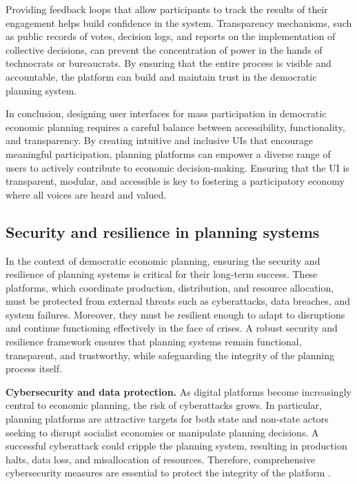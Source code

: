 \begin{refsection}
Providing feedback loops that allow participants to track the results of their engagement helps build confidence in the system. Transparency mechanisms, such as public records of votes, decision logs, and reports on the implementation of collective decisions, can prevent the concentration of power in the hands of technocrats or bureaucrats. By ensuring that the entire process is visible and accountable, the platform can build and maintain trust in the democratic planning system.

\medskip

In conclusion, designing user interfaces for mass participation in democratic economic planning requires a careful balance between accessibility, functionality, and transparency. By creating intuitive and inclusive UIs that encourage meaningful participation, planning platforms can empower a diverse range of users to actively contribute to economic decision-making. Ensuring that the UI is transparent, modular, and accessible is key to fostering a participatory economy where all voices are heard and valued.

\subsection{Security and resilience in planning systems}

In the context of democratic economic planning, ensuring the security and resilience of planning systems is critical for their long-term success. These platforms, which coordinate production, distribution, and resource allocation, must be protected from external threats such as cyberattacks, data breaches, and system failures. Moreover, they must be resilient enough to adapt to disruptions and continue functioning effectively in the face of crises. A robust security and resilience framework ensures that planning systems remain functional, transparent, and trustworthy, while safeguarding the integrity of the planning process itself.

\textbf{Cybersecurity and data protection.} As digital platforms become increasingly central to economic planning, the risk of cyberattacks grows. In particular, planning platforms are attractive targets for both state and non-state actors seeking to disrupt socialist economies or manipulate planning decisions. A successful cyberattack could cripple the planning system, resulting in production halts, data loss, and misallocation of resources. Therefore, comprehensive cybersecurity measures are essential to protect the integrity of the platform \cite[pp.~64]{parker2020cybersecurity}.


\end{refsection}
